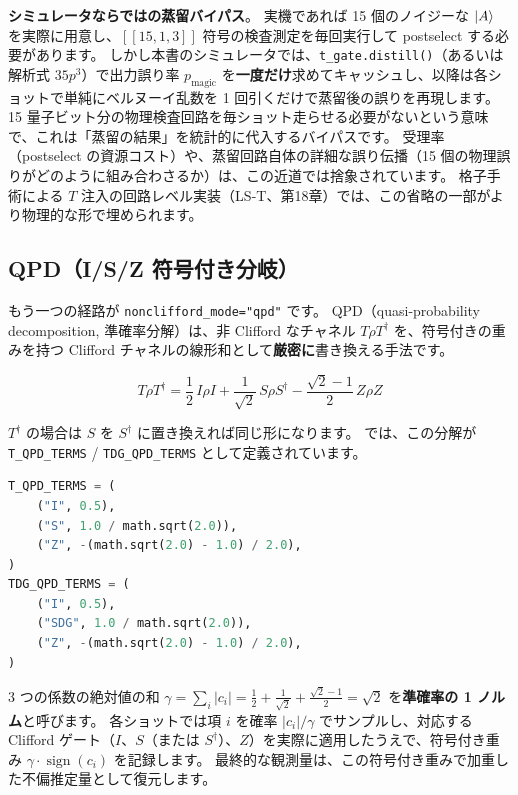 \begin{notebox}
  \textbf{シミュレータならではの蒸留バイパス}。
  実機であれば 15 個のノイジーな $\ket{A}$ を実際に用意し、$[[15,1,3]]$ 符号の検査測定を毎回実行して postselect する必要があります。
  しかし本書のシミュレータでは、\texttt{t\_gate.distill()}（あるいは解析式 $35p^3$）で出力誤り率 $p_{\mathrm{magic}}$ を\textbf{一度だけ}求めてキャッシュし、以降は各ショットで単純にベルヌーイ乱数を 1 回引くだけで蒸留後の誤りを再現します。
  15 量子ビット分の物理検査回路を毎ショット走らせる必要がないという意味で、これは「蒸留の結果」を統計的に代入するバイパスです。
  受理率（postselect の資源コスト）や、蒸留回路自体の詳細な誤り伝播（15 個の物理誤りがどのように組み合わさるか）は、この近道では捨象されています。
  格子手術による $T$ 注入の回路レベル実装（LS-T、第18章）では、この省略の一部がより物理的な形で埋められます。
\end{notebox}

\subsection{QPD（I/S/Z 符号付き分岐）}

もう一つの経路が \texttt{nonclifford\_mode="qpd"} です。
QPD（quasi-probability decomposition, 準確率分解）は、非 Clifford なチャネル $T\rho T^\dagger$ を、符号付きの重みを持つ Clifford チャネルの線形和として\textbf{厳密に}書き換える手法です。

\begin{equation}
  T\rho T^\dagger
    = \frac12\, I\rho I
    + \frac{1}{\sqrt2}\, S\rho S^\dagger
    - \frac{\sqrt2-1}{2}\, Z\rho Z
\end{equation}

$T^\dagger$ の場合は $S$ を $S^\dagger$ に置き換えれば同じ形になります。
 では、この分解が \texttt{T\_QPD\_TERMS} / \texttt{TDG\_QPD\_TERMS} として定義されています。

\begin{lstlisting}[language=Python, caption={T ゲートの QPD 分解（src/stages/01\_mpp/src/ftqc/hybrid\_ftqc\_runtime.py）}]
T_QPD_TERMS = (
    ("I", 0.5),
    ("S", 1.0 / math.sqrt(2.0)),
    ("Z", -(math.sqrt(2.0) - 1.0) / 2.0),
)
TDG_QPD_TERMS = (
    ("I", 0.5),
    ("SDG", 1.0 / math.sqrt(2.0)),
    ("Z", -(math.sqrt(2.0) - 1.0) / 2.0),
)
\end{lstlisting}

3 つの係数の絶対値の和 $\gamma=\sum_i|c_i|=\frac12+\frac{1}{\sqrt2}+\frac{\sqrt2-1}{2}=\sqrt2$ を\textbf{準確率の 1 ノルム}と呼びます。
各ショットでは項 $i$ を確率 $|c_i|/\gamma$ でサンプルし、対応する Clifford ゲート（$I$、$S$（または $S^\dagger$）、$Z$）を実際に適用したうえで、符号付き重み $\gamma\cdot\operatorname{sign}(c_i)$ を記録します。
最終的な観測量は、この符号付き重みで加重した不偏推定量として復元します。

